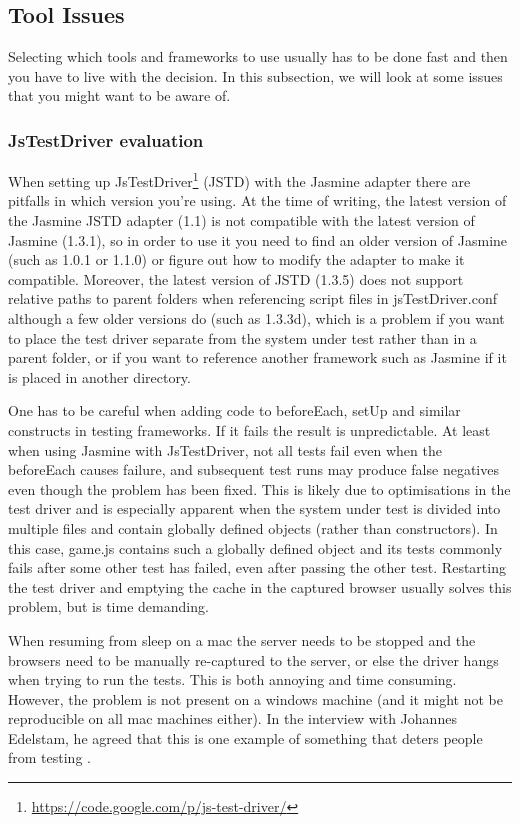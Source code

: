 \documentclass[11pt]{article}
\begin{document}
\subsection{Tool Issues}

Selecting which tools and frameworks to use usually has to be done fast and then you have to live with the decision. In this subsection, we will look at some issues that you might want to be aware of.

\subsubsection{JsTestDriver evaluation}
\label{subsec:jstestdriver}

When setting up JsTestDriver\footnote{\url{https://code.google.com/p/js-test-driver/}} (JSTD) with the Jasmine adapter there are pitfalls in which version you're using. At the time of writing, the latest version of the Jasmine JSTD adapter (1.1) is not compatible with the latest version of Jasmine (1.3.1), so in order to use it you need to find an older version of Jasmine (such as 1.0.1 or 1.1.0) or figure out how to modify the adapter to make it compatible. Moreover, the latest version of JSTD (1.3.5) does not support relative paths to parent folders when referencing script files in jsTestDriver.conf although a few older versions do (such as 1.3.3d), which is a problem if you want to place the test driver separate from the system under test rather than in a parent folder, or if you want to reference another framework such as Jasmine if it is placed in another directory.

One has to be careful when adding code to beforeEach, setUp and similar constructs in testing frameworks. If it fails the result is unpredictable. At least when using Jasmine with JsTestDriver, not all tests fail even when the beforeEach causes failure, and subsequent test runs may produce false negatives even though the problem has been fixed. This is likely due to optimisations in the test driver and is especially apparent when the system under test is divided into multiple files and contain globally defined objects (rather than constructors). In this case, game.js contains such a globally defined object and its tests commonly fails after some other test has failed, even after passing the other test. Restarting the test driver and emptying the cache in the captured browser usually solves this problem, but is time demanding.

When resuming from sleep on a mac the server needs to be stopped and the browsers need to be manually re-captured to the server, or else the driver hangs when trying to run the tests. This is both annoying and time consuming. However, the problem is not present on a windows machine (and it might not be reproducible on all mac machines either). In the interview with Johannes Edelstam, he agreed that this is one example of something that deters people from testing \cite{Edelstam}.
\end{document}
